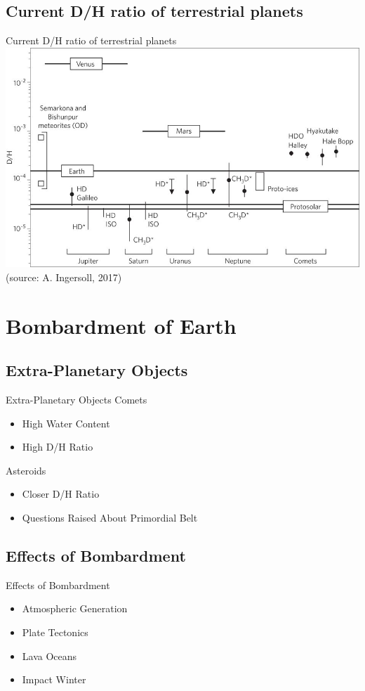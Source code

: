 \documentclass[11pt, aspectratio=169]{beamer}
\begin{document}
\subsection{Current D/H ratio of terrestrial planets}
\begin{frame}[t]{Current D/H ratio of terrestrial planets}
	\centering
	\includegraphics[height=.7\textheight]{figures/dh-ratio-terrestrial-planets.jpg}\\
	\small (source: A. Ingersoll, 2017)
\end{frame}



\section{Bombardment of Earth}
\subsection{Extra-Planetary Objects}
\begin{frame}[t]{Extra-Planetary Objects}
Comets
\begin{itemize}
\item High Water Content
\item High D/H Ratio
\end{itemize}

Asteroids
\begin{itemize}
\item Closer D/H Ratio
\item Questions Raised About Primordial Belt
\end{itemize}
\end{frame}


\subsection{Effects of Bombardment}
\begin{frame}[t]{Effects of Bombardment}
\begin{itemize}
\item Atmospheric Generation
\item Plate Tectonics
\item Lava Oceans
\item Impact Winter
\end{itemize}
\end{frame}
\end{document}
